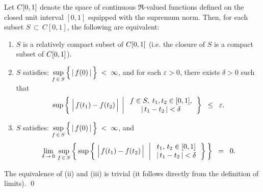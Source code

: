 \begin{theorem}
\mbox{}\vskip 0.1cm
\noindent
Let $C[0,1]$ denote the space of continuous $\Re$-valued functions
defined on the closed unit interval $[0,1]$ equipped with the supremum norm.
Then, for each subset $S \,\subset\, C[0,1]$, the following are equivalent:
\begin{enumerate}
\item	$S$ is a relatively compact subset of $C[0,1]$ (i.e. the closure of $S$ is a compact subset of $C[0,1]$).
\item	$S$ satisfies:\;\;
		$\underset{f\,\in\,S}{\sup}\left\{\,\vert\,\overset{{\color{white}.}}{f}(0)\,\vert\,\right\} \;<\; \infty$, and
		for each $\varepsilon > 0$, there exists $\delta > 0$ such that
		\begin{equation*}
		\sup\left\{\;
		\left\vert\,\overset{{\color{white}.}}{f}(t_{1}) - f(t_{2})\,\right\vert
		\;\left\vert\;
		\begin{array}{c} f \in S, \; t_{1},t_{2} \in [0,1], \\ \vert\,t_{1} - t_{2}\,\vert < \delta \end{array}
		\right.
		\right\}
		\;\;\leq\;\; \varepsilon.
		\end{equation*}
\item	$S$ satisfies:\;\;
		$\underset{f\,\in\,S}{\sup}\left\{\,\vert\,\overset{{\color{white}.}}{f}(0)\,\vert\,\right\} \;<\; \infty$, and
		\begin{equation*}
		\lim_{\delta\,\rightarrow\,0}\,
			\sup_{f\,\in\,S}\left\{\,
				\sup\left\{\;
				\left\vert\,\overset{{\color{white}.}}{f}(t_{1}) - f(t_{2})\,\right\vert
				\,\;\left\vert\;
				\begin{array}{c} t_{1}, \, t_{2} \in [0,1] \\ \vert\,t_{1} - t_{2}\,\vert < \delta \end{array}
				\right.
				\right\}
			\,\right\}
		\;\;=\;\; 0.
		\end{equation*}
\end{enumerate}
\end{theorem}
\proof
The equivalence of (ii) and (iii) is trivial (it follows directly from the definition of limits).
\qed
